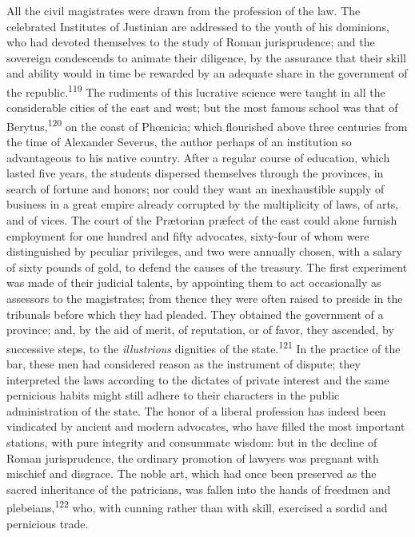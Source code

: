 All the civil magistrates were drawn from the profession of the
law. The celebrated Institutes of Justinian are addressed to the
youth of his dominions, who had devoted themselves to the study
of Roman jurisprudence; and the sovereign condescends to animate
their diligence, by the assurance that their skill and ability
would in time be rewarded by an adequate share in the government
of the republic.\textsuperscript{119} The rudiments of this lucrative science were
taught in all the considerable cities of the east and west; but
the most famous school was that of Berytus,\textsuperscript{120} on the coast of
Phœnicia; which flourished above three centuries from the time of
Alexander Severus, the author perhaps of an institution so
advantageous to his native country. After a regular course of
education, which lasted five years, the students dispersed
themselves through the provinces, in search of fortune and
honors; nor could they want an inexhaustible supply of business
in a great empire already corrupted by the multiplicity of laws,
of arts, and of vices. The court of the Prætorian præfect of the
east could alone furnish employment for one hundred and fifty
advocates, sixty-four of whom were distinguished by peculiar
privileges, and two were annually chosen, with a salary of sixty
pounds of gold, to defend the causes of the treasury. The first
experiment was made of their judicial talents, by appointing them
to act occasionally as assessors to the magistrates; from thence
they were often raised to preside in the tribunals before which
they had pleaded. They obtained the government of a province;
and, by the aid of merit, of reputation, or of favor, they
ascended, by successive steps, to the \textit{illustrious} dignities of
the state.\textsuperscript{121} In the practice of the bar, these men had
considered reason as the instrument of dispute; they interpreted
the laws according to the dictates of private interest and the
same pernicious habits might still adhere to their characters in
the public administration of the state. The honor of a liberal
profession has indeed been vindicated by ancient and modern
advocates, who have filled the most important stations, with pure
integrity and consummate wisdom: but in the decline of Roman
jurisprudence, the ordinary promotion of lawyers was pregnant
with mischief and disgrace. The noble art, which had once been
preserved as the sacred inheritance of the patricians, was fallen
into the hands of freedmen and plebeians,\textsuperscript{122} who, with cunning
rather than with skill, exercised a sordid and pernicious trade.
